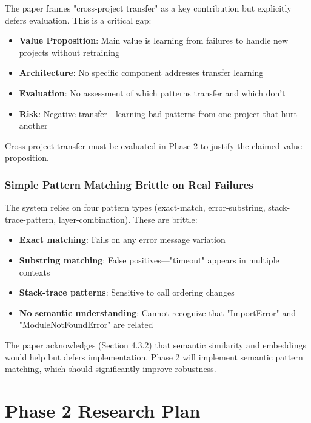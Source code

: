 \documentclass[11pt]{article}
\begin{document}
The paper frames "cross-project transfer" as a key contribution but explicitly defers evaluation. This is a critical gap:

\begin{itemize}
    \item \textbf{Value Proposition}: Main value is learning from failures to handle new projects without retraining
    \item \textbf{Architecture}: No specific component addresses transfer learning
    \item \textbf{Evaluation}: No assessment of which patterns transfer and which don't
    \item \textbf{Risk}: Negative transfer—learning bad patterns from one project that hurt another
\end{itemize}

Cross-project transfer must be evaluated in Phase 2 to justify the claimed value proposition.

\subsubsection{Simple Pattern Matching Brittle on Real Failures}

The system relies on four pattern types (exact-match, error-substring, stack-trace-pattern, layer-combination). These are brittle:

\begin{itemize}
    \item \textbf{Exact matching}: Fails on any error message variation
    \item \textbf{Substring matching}: False positives—"timeout" appears in multiple contexts
    \item \textbf{Stack-trace patterns}: Sensitive to call ordering changes
    \item \textbf{No semantic understanding}: Cannot recognize that "ImportError" and "ModuleNotFoundError" are related
\end{itemize}

The paper acknowledges (Section 4.3.2) that semantic similarity and embeddings would help but defers implementation. Phase 2 will implement semantic pattern matching, which should significantly improve robustness.

\section{Phase 2 Research Plan}
\label{sec:phase2_plan}
\end{document}
